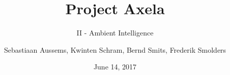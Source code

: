 

\usepackage{pgfpages}
\usepackage{lipsum}
\usepackage{comment}

\title[]{Project Axela}
\subtitle{II - Ambient Intelligence}
\author{Sebastiaan Aussems, Kwinten Schram, Bernd Smits, Frederik Smolders}
\date{June 14, 2017}


\beamertemplatenavigationsymbolsempty 


